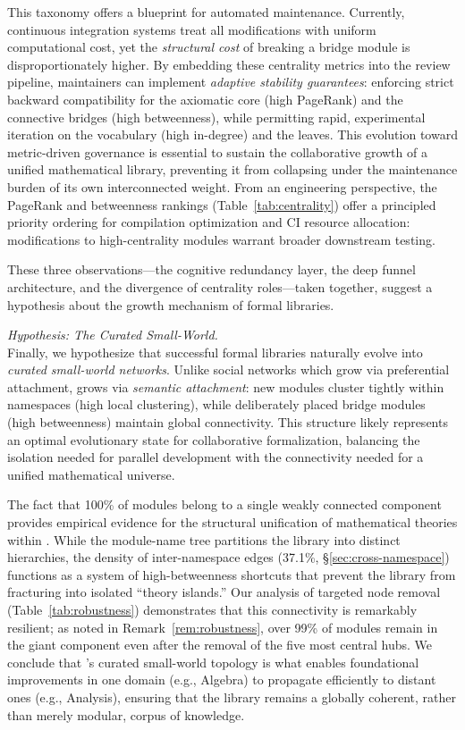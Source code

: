 This taxonomy offers a blueprint for automated maintenance. Currently, continuous integration systems treat all modifications with uniform computational cost, yet the \textit{structural cost} of breaking a bridge module is disproportionately higher. By embedding these centrality metrics into the review pipeline, maintainers can implement \textit{adaptive stability guarantees}: enforcing strict backward compatibility for the axiomatic core (high PageRank) and the connective bridges (high betweenness), while permitting rapid, experimental iteration on the vocabulary (high in-degree) and the leaves. This evolution toward metric-driven governance is essential to sustain the collaborative growth of a unified mathematical library, preventing it from collapsing under the maintenance burden of its own interconnected weight. From an engineering perspective, the PageRank and betweenness rankings (Table~\ref{tab:centrality}) offer a principled priority ordering for compilation optimization and CI resource allocation: modifications to high-centrality modules warrant broader downstream testing.

\medskip
These three observations---the cognitive redundancy layer, the deep funnel architecture, and the divergence of centrality roles---taken together, suggest a hypothesis about the growth mechanism of formal libraries.

\medskip
\noindent \textit{Hypothesis: The Curated Small-World.} \\
Finally, we hypothesize that successful formal libraries naturally evolve into \textit{curated small-world networks}. Unlike social networks which grow via preferential attachment,  grows via \textit{semantic attachment}: new modules cluster tightly within namespaces (high local clustering), while deliberately placed bridge modules (high betweenness) maintain global connectivity. This structure likely represents an optimal evolutionary state for collaborative formalization, balancing the isolation needed for parallel development with the connectivity needed for a unified mathematical universe.

The fact that 100\% of modules belong to a single weakly connected component provides empirical evidence for the structural unification of mathematical theories within . While the module-name tree partitions the library into distinct hierarchies, the density of inter-namespace edges (37.1\%, \S\ref{sec:cross-namespace}) functions as a system of high-betweenness shortcuts that prevent the library from fracturing into isolated ``theory islands.'' Our analysis of targeted node removal (Table~\ref{tab:robustness}) demonstrates that this connectivity is remarkably resilient; as noted in Remark~\ref{rem:robustness}, over 99\% of modules remain in the giant component even after the removal of the five most central hubs. We conclude that 's curated small-world topology is what enables foundational improvements in one domain (e.g., Algebra) to propagate efficiently to distant ones (e.g., Analysis), ensuring that the library remains a globally coherent, rather than merely modular, corpus of knowledge.

